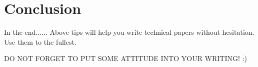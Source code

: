 \documentclass[10pt]{beamer}
\begin{document}
\section{Conclusion}

\begin{frame}{In the end......}
	Above tips will help you write technical papers without hesitation. Use them to the fullest. \\
	\vspace{10mm}
	\begin{alertblock}{
			DO NOT FORGET TO PUT SOME ATTITUDE INTO YOUR WRITING! :)}
	\end{alertblock}
	

\end{frame}
\end{document}
